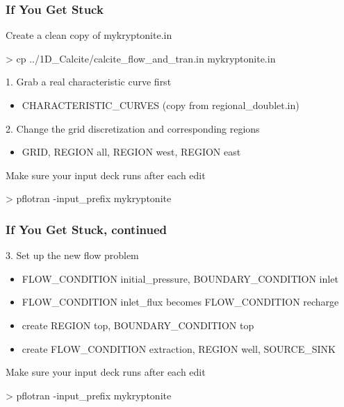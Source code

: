 \documentclass{beamer}
\begin{document}
\begin{frame}[fragile]\frametitle{If You Get Stuck}
Create a clean copy of mykryptonite.in
\begin{semiverbatim}
  > cp ../1D\_Calcite/calcite\_flow\_and\_tran.in mykryptonite.in
\end{semiverbatim}
1. Grab a real characteristic curve first
\begin{itemize}\small
  \item{CHARACTERISTIC\_CURVES (copy from regional\_doublet.in)}
\end{itemize}
2. Change the grid discretization and corresponding regions
\begin{itemize}\small
  \item{GRID, REGION all, REGION west, REGION east}
\end{itemize}
Make sure your input deck runs after each edit
\begin{semiverbatim}
  > pflotran -input\_prefix mykryptonite
\end{semiverbatim}
\end{frame}

\begin{frame}[fragile]\frametitle{If You Get Stuck, continued}
3. Set up the new flow problem
\begin{itemize}\small
  \item{FLOW\_CONDITION initial\_pressure, BOUNDARY\_CONDITION inlet}
  \item{FLOW\_CONDITION inlet\_flux becomes FLOW\_CONDITION recharge}
  \item{create REGION top, BOUNDARY\_CONDITION top}
  \item{create FLOW\_CONDITION extraction, REGION well, SOURCE\_SINK}
\end{itemize}
Make sure your input deck runs after each edit
\begin{semiverbatim}
  > pflotran -input\_prefix mykryptonite
\end{semiverbatim}
\end{frame}
\end{document}
